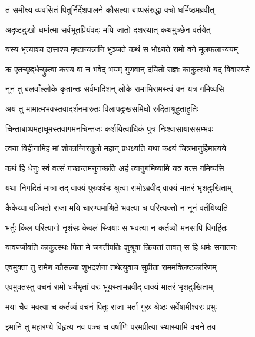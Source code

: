 
\twolineshloka
{तं समीक्ष्य व्यवसितं पितुर्निर्देशपालने}
{कौसल्या बाष्पसंरुद्धा वचो धर्मिष्ठमब्रवीत्} %

\twolineshloka
{अदृष्टदुःखो धर्मात्मा सर्वभूतप्रियंवदः}
{मयि जातो दशरथात् कथमुञ्छेन वर्तयेत्} %

\twolineshloka
{यस्य भृत्याश्च दासाश्च मृष्टान्यन्नानि भुञ्जते}
{कथं स भोक्ष्यते रामो वने मूलफलान्ययम्} %

\twolineshloka
{क एतच्छ्रद्दधेच्छ्रुत्वा कस्य वा न भवेद् भयम्}
{गुणवान् दयितो राज्ञः काकुत्स्थो यद् विवास्यते} %

\twolineshloka
{नूनं तु बलवाँल्लोके कृतान्तः सर्वमादिशन्}
{लोके रामाभिरामस्त्वं वनं यत्र गमिष्यसि} %

\twolineshloka
{अयं तु मामात्मभवस्तवादर्शनमारुतः}
{विलापदुःखसमिधो रुदिताश्रुहुताहुतिः} %

\twolineshloka
{चिन्ताबाष्पमहाधूमस्तवागमनचिन्तजः}
{कर्शयित्वाधिकं पुत्र निःश्वासायाससम्भवः} %

\twolineshloka
{त्वया विहीनामिह मां शोकाग्निरतुलो महान्}
{प्रधक्ष्यति यथा कक्ष्यं चित्रभानुर्हिमात्यये} %

\twolineshloka
{कथं हि धेनुः स्वं वत्सं गच्छन्तमनुगच्छति}
{अहं त्वानुगमिष्यामि यत्र वत्स गमिष्यसि} %

\twolineshloka
{यथा निगदितं मात्रा तद् वाक्यं पुरुषर्षभः}
{श्रुत्वा रामोऽब्रवीद् वाक्यं मातरं भृशदुःखिताम्} %

\twolineshloka
{कैकेय्या वञ्चितो राजा मयि चारण्यमाश्रिते}
{भवत्या च परित्यक्तो न नूनं वर्तयिष्यति} %

\twolineshloka
{भर्तुः किल परित्यागो नृशंसः केवलं स्त्रियाः}
{स भवत्या न कर्तव्यो मनसापि विगर्हितः} %

\twolineshloka
{यावज्जीवति काकुत्स्थः पिता मे जगतीपतिः}
{शुश्रूषा क्रियतां तावत् स हि धर्मः सनातनः} %

\twolineshloka
{एवमुक्ता तु रामेण कौसल्या शुभदर्शना}
{तथेत्युवाच सुप्रीता राममक्लिष्टकारिणम्} %

\twolineshloka
{एवमुक्तस्तु वचनं रामो धर्मभृतां वरः}
{भूयस्तामब्रवीद् वाक्यं मातरं भृशदुःखिताम्} %

\twolineshloka
{मया चैव भवत्या च कर्तव्यं वचनं पितुः}
{राजा भर्ता गुरुः श्रेष्ठः सर्वेषामीश्वरः प्रभुः} %

\twolineshloka
{इमानि तु महारण्ये विहृत्य नव पञ्च च}
{वर्षाणि परमप्रीत्या स्थास्यामि वचने तव} %

